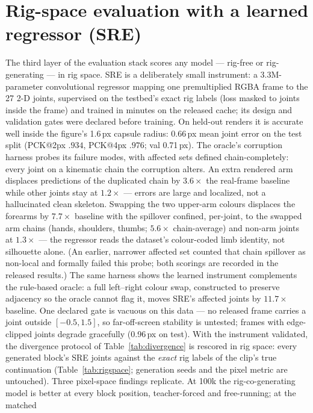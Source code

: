 \documentclass[10pt,twocolumn]{article}
\begin{document}
\section{Rig-space evaluation with a learned regressor (SRE)}\label{sec:sre}
The third layer of the evaluation stack scores any model — rig-free or rig-generating — in rig space. SRE is a
deliberately small instrument: a 3.3M-parameter convolutional regressor mapping one premultiplied RGBA frame to the
27 2-D joints, supervised on the testbed's exact rig labels (loss masked to joints inside the frame) and trained in
minutes on the released cache; its design and validation gates were declared before training. On held-out renders it
is accurate well inside the figure's 1.6\,px capsule radius: 0.66\,px mean joint error on the test split (PCK@2px
$.934$, PCK@4px $.976$; val 0.71\,px). The oracle's corruption harness probes its failure modes, with affected sets
defined chain-completely: every joint on a kinematic chain the corruption alters. An extra rendered arm displaces
predictions of the duplicated chain by $3.6\times$ the real-frame baseline while other joints stay at $1.2\times$ —
errors are large and localized, not a hallucinated clean skeleton. Swapping the two upper-arm colours displaces the
forearms by $7.7\times$ baseline with the spillover confined, per-joint, to the swapped arm chains (hands, shoulders,
thumbs; $5.6\times$ chain-average) and non-arm joints at $1.3\times$ — the regressor reads the dataset's
colour-coded limb identity, not silhouette alone. (An earlier, narrower affected set counted that chain spillover as
non-local and formally failed this probe; both scorings are recorded in the released results.) The same harness
shows the learned instrument complements the rule-based oracle: a full left--right colour swap, constructed to
preserve adjacency so the oracle cannot flag it, moves SRE's affected joints by $11.7\times$
baseline. One declared gate is vacuous on this data — no released frame carries a joint outside $[-0.5,1.5]$, so
far-off-screen stability is untested; frames with edge-clipped joints degrade gracefully (0.96\,px on test).
With the instrument validated, the divergence protocol of Table~\ref{tab:divergence} is rescored in rig space: every
generated block's SRE joints against the \emph{exact} rig labels of the clip's true continuation
(Table~\ref{tab:rigspace}; generation seeds and the pixel metric are untouched). Three pixel-space findings replicate.
At 100k the rig-co-generating model is better at every block position, teacher-forced and free-running; at the matched
\end{document}
